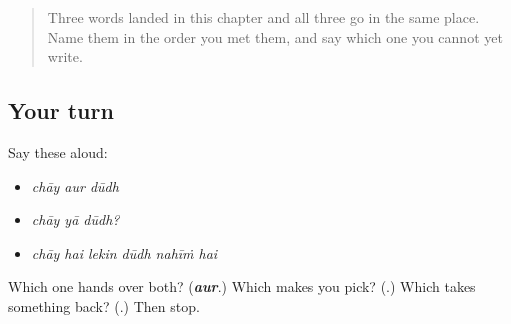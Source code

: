 \label{lesson:HI-R68-three-joins}



\begin{quote}
Three words landed in this chapter and all three go in the same place. Name them in the order you met them, and say which one you cannot yet write.
\end{quote}

\subsection*{Your turn}
Say these aloud:

\begin{itemize}
\raggedright
  \item \emph{chāy aur dūdh}
  \item \emph{chāy yā dūdh?}
  \item \emph{chāy hai lekin dūdh nahīṁ hai}
\end{itemize}

\begin{tcolorbox}[breakable,colback=teal!4,colframe=teal!35!black,title={Before you move on}]
Which one hands over both? (\emph{\textbf{aur}}.) Which makes you pick? (\textbf{}.) Which takes something back? (\textbf{}.) Then stop.
\end{tcolorbox}
